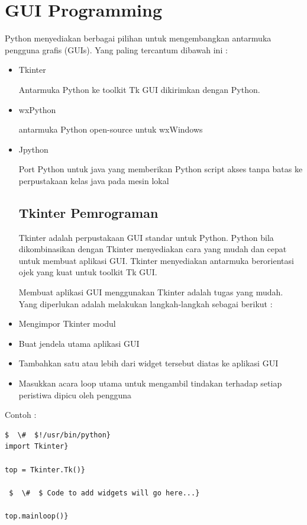 \section{GUI Programming}
\hspace*{0.5in} Python menyediakan berbagai pilihan untuk mengembangkan antarmuka pengguna grafis (GUIs). Yang paling tercantum dibawah ini : 
\begin{itemize}
\item Tkinter 

Antarmuka Python ke toolkit Tk GUI dikirimkan dengan Python.  
\item wxPython 

antarmuka Python open-source untuk wxWindows 
 
\item Jpython 

Port Python untuk java yang memberikan Python script akses tanpa batas ke perpustakaan kelas java pada mesin lokal 

\subsection{Tkinter Pemrograman} 
\hspace*{0.5in} Tkinter adalah perpustakaan GUI standar untuk Python. Python bila dikombinasikan dengan Tkinter menyediakan cara yang mudah dan cepat untuk membuat aplikasi GUI. Tkinter menyediakan antarmuka berorientasi ojek yang kuat untuk toolkit Tk GUI. 
 
\hspace*{0.5in} Membuat aplikasi GUI menggunakan Tkinter adalah tugas yang mudah. Yang diperlukan adalah melakukan langkah-langkah sebagai berikut : 
 
\item Mengimpor Tkinter modul 
\item Buat jendela utama aplikasi GUI 
\item Tambahkan satu atau lebih dari widget tersebut diatas ke aplikasi GUI 
\item Masukkan acara loop utama untuk mengambil tindakan terhadap setiap peristiwa dipicu oleh pengguna\end{itemize}
 
\vspace{12pt} 
Contoh : 
\begin{verbatim}
$  \#  $!/usr/bin/python} 
import Tkinter} 

top = Tkinter.Tk()} 

 $  \#  $ Code to add widgets will go here...} 

top.mainloop()} 
\end{verbatim}

